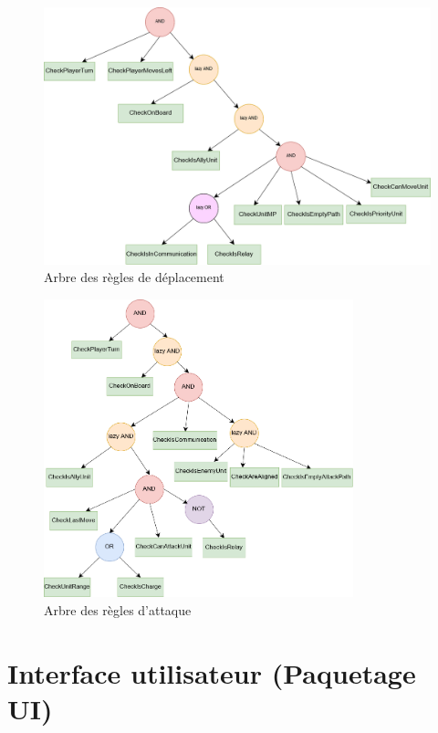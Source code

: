 \documentclass[a4paper]{report}
\begin{document}
\begin{figure}[h]
\centering
\includegraphics[width=1\textwidth]{treeRules/ArbreMoveRules.png}
\caption{Arbre des règles de déplacement}
\label{fig:treeMove}
\end{figure}

\begin{figure}[h]
\centering
\includegraphics[width=0.8\textwidth]{treeRules/ArbreAttackRules.png}
\caption{Arbre des règles d'attaque}
\label{fig:treeAttack}
\end{figure}


\section{Interface utilisateur (Paquetage UI)}
\end{document}
